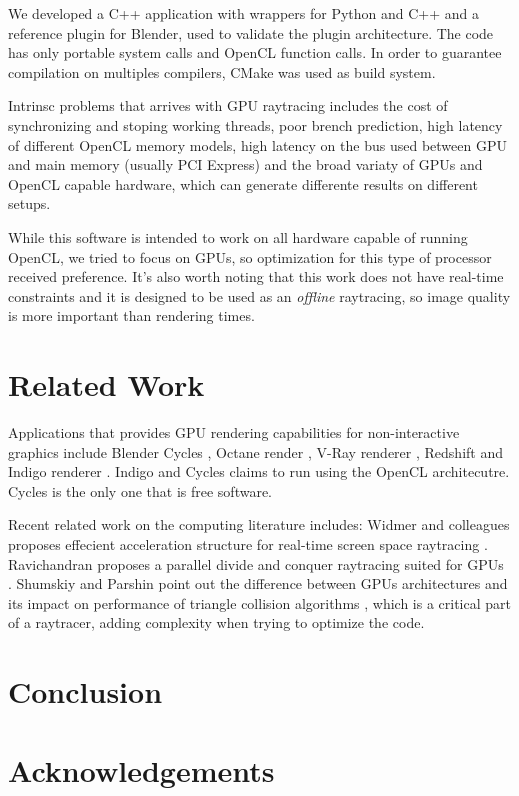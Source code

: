 \documentclass[a4paper]{sbgames}               %
\begin{document}
We developed a C++ application with wrappers for
Python %
and C++ and a reference plugin for Blender, used to validate the
plugin architecture. The code has only portable system calls and
OpenCL function calls. In order to guarantee compilation on multiples
compilers, CMake was used as build system.

Intrinsc problems that arrives with GPU raytracing includes the cost
of synchronizing and stoping working threads, poor brench prediction,
high latency of different OpenCL memory models, high latency on the
bus used between GPU and main memory (usually PCI Express) and the
broad variaty of GPUs and OpenCL capable hardware, which can generate
differente results on different setups.

While this software is intended to work on all hardware capable of
running OpenCL, we tried to focus on GPUs, so optimization for this
type of processor received preference. It's also worth noting that
this work does not have real-time constraints and it is designed to be
used as an \emph{offline} raytracing, so image quality is more
important than rendering times.

\section{Related Work}
\label{sec:related-work}

Applications that provides GPU rendering capabilities for
non-interactive graphics include Blender Cycles\cite{Cycles} , Octane
render \cite{Octane}, V-Ray renderer \cite{VRAY}, Redshift
\cite{Redshift} and Indigo renderer \cite{Indigo}. Indigo and Cycles
claims to run using the OpenCL architecutre. Cycles is the only one
that is free software.

Recent related work on the computing literature includes: Widmer and
colleagues proposes effecient acceleration structure for real-time
screen space raytracing \cite{Widmer}. Ravichandran proposes a
parallel divide and conquer raytracing suited for GPUs
\cite{Ravichandran}. Shumskiy and Parshin point out the difference
between GPUs architectures and its impact on performance of triangle
collision algorithms \cite{Shumskiy}, which is a critical part of a
raytracer, adding complexity when trying to optimize the code.

\section{Conclusion}
\label{sec:conclusion}

\section*{Acknowledgements}




\end{document}
